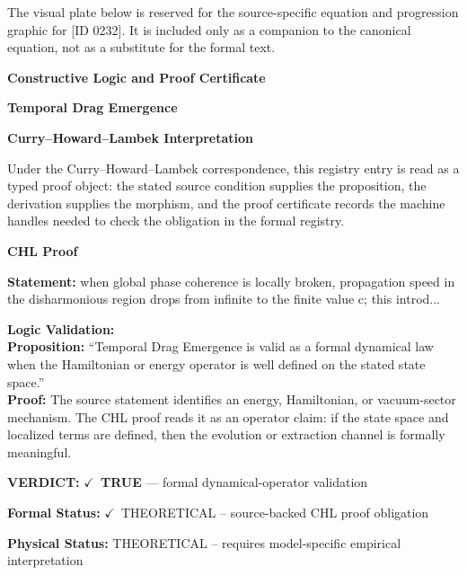 \begingroup\footnotesize\sloppy
The visual plate below is reserved for the source-specific equation and progression graphic for [ID 0232]. It is included only as a companion to the canonical equation, not as a substitute for the formal text.
\par\endgroup
\ifTZPDarkEdition
{}
\fi

\clearpage
\begingroup\tzpsupportsetup
\noindent\textbf{\fontsize{10.8pt}{12.8pt}\selectfont [ID 0232] Constructive Logic and Proof Certificate}\par
\noindent\textbf{\fontsize{10pt}{12pt}\selectfont Temporal Drag Emergence}\par
\vspace{0.45em}
\begingroup
\footnotesize
\setlength{\parskip}{0.22em}
\setlength{\parindent}{0pt}
\noindent\textbf{Curry--Howard--Lambek Interpretation}\par
Under the Curry--Howard--Lambek correspondence, this registry entry is read as a typed proof
object: the stated source condition supplies the proposition, the derivation supplies the
morphism, and the proof certificate records the machine handles needed to check the obligation
in the formal registry.

\vspace{0.45em}
\noindent\textbf{CHL Proof}\par
\textbf{Statement:} when global phase coherence is locally broken, propagation speed in the disharmonious
region drops from infinite to the finite value c; this introd...

\textbf{Logic Validation:}\\
\textbf{Proposition:} ``Temporal Drag Emergence is valid as a formal dynamical law when the Hamiltonian or
energy operator is well defined on the stated state space.''\\
\textbf{Proof:} The source statement identifies an energy, Hamiltonian, or vacuum-sector mechanism. The
CHL proof reads it as an operator claim: if the state space and localized terms are
defined, then the evolution or extraction channel is formally meaningful.

\textbf{VERDICT:} \ensuremath{\checkmark}\ \textbf{TRUE} --- formal dynamical-operator validation

\textbf{Formal Status:} \ensuremath{\checkmark}\ THEORETICAL -- source-backed CHL proof obligation

\textbf{Physical Status:} THEORETICAL -- requires model-specific empirical interpretation
\par\vspace{0.45em}
\par
\ifTZPDarkEdition
{}
\fi
\endgroup
\endgroup
